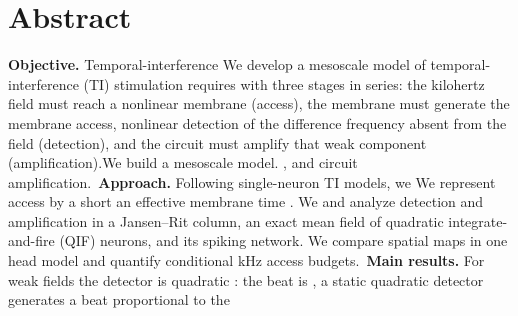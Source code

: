 \documentclass[11pt,a4paper]{article}
\newif\ifjne
\newif\ifsupp
\providecommand{\DIFaddtex}[1]{{\protect\color{blue} \sf #1}} %
\providecommand{\DIFdeltex}[1]{{\protect\color{red} \scriptsize #1}} %
\providecommand{\DIFaddbegin}{} %
\providecommand{\DIFaddend}{} %
\providecommand{\DIFdelbegin}{} %
\providecommand{\DIFdelend}{} %
\providecommand{\DIFadd}[1]{\texorpdfstring{\DIFaddtex{#1}}{#1}} %
\providecommand{\DIFdel}[1]{\texorpdfstring{\DIFdeltex{#1}}{}} %
\begin{document}
\ifsupp\else
\section*{Abstract}

\noindent
\ifjne
\textbf{Objective.} \DIFdelbegin \DIFdel{Temporal-interference }\DIFdelend \DIFaddbegin \DIFadd{We develop a mesoscale model of temporal-interference }\DIFaddend (TI) stimulation \DIFdelbegin \DIFdel{requires }\DIFdelend \DIFaddbegin \DIFadd{with }\DIFaddend three stages
in series: \DIFdelbegin \DIFdel{the kilohertz field must reach a
nonlinear membrane (access), the membrane must generate the }\DIFdelend \DIFaddbegin \DIFadd{membrane access, nonlinear detection of the }\DIFaddend difference frequency absent from
the field\DIFdelbegin \DIFdel{(detection), and the circuit must amplify that weak component
(amplification).We build a mesoscale model.}\DIFdelend \DIFaddbegin \DIFadd{, and circuit amplification.}\DIFaddend \
\textbf{Approach.} \DIFdelbegin \DIFdel{Following single-neuron TI models, we }\DIFdelend \DIFaddbegin \DIFadd{We }\DIFaddend represent access by \DIFdelbegin \DIFdel{a short }\DIFdelend \DIFaddbegin \DIFadd{an }\DIFaddend effective membrane time \DIFdelbegin \DIFdel{. We }\DIFdelend \DIFaddbegin \DIFadd{and }\DIFaddend analyze detection and
amplification in a Jansen--Rit column, an exact mean field of quadratic
integrate-and-fire \DIFaddbegin \DIFadd{(QIF) }\DIFaddend neurons, and its spiking network. \DIFaddbegin \DIFadd{We compare spatial maps in
one head model and quantify conditional kHz access budgets.}\DIFaddend \
\textbf{Main results.} For weak fields\DIFdelbegin \DIFdel{the detector is quadratic : the beat is
}\DIFdelend \DIFaddbegin \DIFadd{, a static quadratic detector generates a beat }\DIFaddend proportional to the
\end{document}
